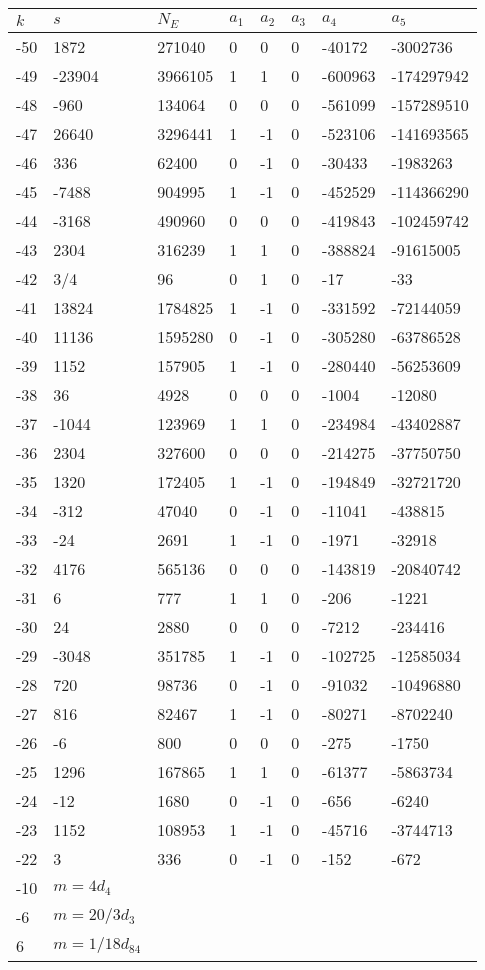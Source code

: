 \documentclass{amsart}
\begin{document}
\begin{longtable}{|l|l|l|lllll|}
\hline
$k$ & $s$ & $N_E$ & $a_1$ & $a_2$ & $a_3$ & $a_4$ & $a_5$\\
\hline
-50&1872&271040&0&0&0&-40172&-3002736\\
-49&-23904&3966105&1&1&0&-600963&-174297942\\
-48&-960&134064&0&0&0&-561099&-157289510\\
-47&26640&3296441&1&-1&0&-523106&-141693565\\
-46&336&62400&0&-1&0&-30433&-1983263\\
-45&-7488&904995&1&-1&0&-452529&-114366290\\
-44&-3168&490960&0&0&0&-419843&-102459742\\
-43&2304&316239&1&1&0&-388824&-91615005\\
-42&3/4&96&0&1&0&-17&-33\\
-41&13824&1784825&1&-1&0&-331592&-72144059\\
-40&11136&1595280&0&-1&0&-305280&-63786528\\
-39&1152&157905&1&-1&0&-280440&-56253609\\
-38&36&4928&0&0&0&-1004&-12080\\
-37&-1044&123969&1&1&0&-234984&-43402887\\
-36&2304&327600&0&0&0&-214275&-37750750\\
-35&1320&172405&1&-1&0&-194849&-32721720\\
-34&-312&47040&0&-1&0&-11041&-438815\\
-33&-24&2691&1&-1&0&-1971&-32918\\
-32&4176&565136&0&0&0&-143819&-20840742\\
-31&6&777&1&1&0&-206&-1221\\
-30&24&2880&0&0&0&-7212&-234416\\
-29&-3048&351785&1&-1&0&-102725&-12585034\\
-28&720&98736&0&-1&0&-91032&-10496880\\
-27&816&82467&1&-1&0&-80271&-8702240\\
-26&-6&800&0&0&0&-275&-1750\\
-25&1296&167865&1&1&0&-61377&-5863734\\
-24&-12&1680&0&-1&0&-656&-6240\\
-23&1152&108953&1&-1&0&-45716&-3744713\\
-22&3&336&0&-1&0&-152&-672\\
-10&$m=4d_{4}$&&\multicolumn{5}{c|}{}\\
-6&$m=20/3d_{3}$&&\multicolumn{5}{c|}{}\\
6&$m=1/18d_{84}$&&\multicolumn{5}{c|}{}\\
\hline
\end{longtable}
\end{document}
